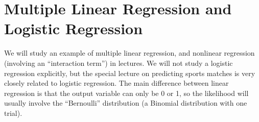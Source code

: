\section{Multiple Linear Regression and Logistic Regression}
We will study an example of multiple linear regression, and nonlinear regression
(involving an ``interaction term'') in lectures.
We will not study a logistic regression explicitly, but the special
lecture on predicting sports matches is very closely related to logistic
regression. The main difference between linear regression is that the output
variable can only be 0 or 1, so the likelihood will usually involve the
``Bernoulli'' distribution (a Binomial distribution with one trial).


